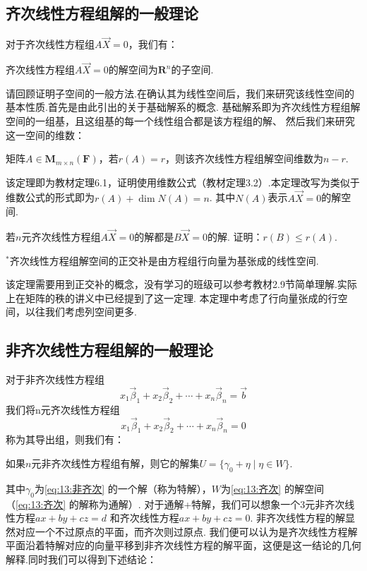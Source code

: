 \subsection{齐次线性方程组解的一般理论}
对于齐次线性方程组$A\vec{X}=0$，我们有：
\begin{theorem}
    齐次线性方程组$A\vec{X}=0$的解空间为$\mathbf{R}^n$的子空间.
\end{theorem}
请回顾证明子空间的一般方法.在确认其为线性空间后，我们来研究该线性空间的基本性质.首先是由此引出的关于基础解系的概念.
基础解系即为齐次线性方程组解空间的一组基，且这组基的每一个线性组合都是该方程组的解、
然后我们来研究这一空间的维数：
\begin{theorem}
    矩阵$A \in \mathbf{M}_{m \times n}(\mathbf{F})$，若$r(A) = r$，则该齐次线性方程组解空间维数为$n - r$.
\end{theorem}
该定理即为教材定理6.1，证明使用维数公式（教材定理3.2）.本定理改写为类似于维数公式的形式即为$r(A) + \dim N(A) = n$.
其中$N(A)$表示$A\vec{X}=0$的解空间.
\begin{example}
    若$n$元齐次线性方程组$A\vec{X} = 0$的解都是$B\vec{X} = 0$的解. 证明：$r(B) \leqslant r(A)$.
\end{example}
\begin{theorem}
    $^*$齐次线性方程组解空间的正交补是由方程组行向量为基张成的线性空间.
\end{theorem}
该定理需要用到正交补的概念，没有学习的班级可以参考教材2.9节简单理解.实际上在矩阵的秩的讲义中已经提到了这一定理.
本定理中考虑了行向量张成的行空间，以往我们考虑列空间更多.

\subsection{非齐次线性方程组解的一般理论}
对于非齐次线性方程组
\begin{equation} \label{eq:13:非齐次}
    x_1\vec{\beta}_1+x_2\vec{\beta}_2+\cdots+x_n\vec{\beta}_n=\vec{b}
\end{equation}
我们将n元齐次线性方程组
\begin{equation} \label{eq:13:齐次}
    x_1\vec{\beta}_1+x_2\vec{\beta}_2+\cdots+x_n\vec{\beta}_n=0
\end{equation}
称为其导出组，则我们有：
\begin{theorem}
    如果$n$元非齐次线性方程组有解，则它的解集$U=\{\gamma_0+\eta \mid \eta \in W\}$.
\end{theorem}
其中$\gamma_0$为\autoref{eq:13:非齐次} 的一个解（称为特解），$W$为\autoref{eq:13:齐次} 的解空间（\autoref*{eq:13:齐次} 的解称为通解）.
对于通解+特解，我们可以想象一个3元非齐次线性方程$ax + by + cz = d$ 和齐次线性方程$ax + by + cz = 0$.
非齐次线性方程的解显然对应一个不过原点的平面，而齐次则过原点.
我们便可以认为是齐次线性方程解平面沿着特解对应的向量平移到非齐次线性方程的解平面，这便是这一结论的几何解释.同时我们可以得到下述结论：

